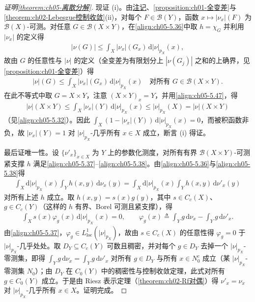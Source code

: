 \documentclass[../../main.tex]{subfiles}%
\begin{document}
\begin{proof}[证明\cref{theorem:ch05-离散分解}]
现证 (i)。由\hyperref[remark:ch05-变差可测]{注记}、\cref{proposition:ch01-全变差}与\cref{theorem:ch02-Lebesgue控制收敛}(ii)，对每个 $F\in\mathscr{B}(Y)$，函数 $x\mapsto|\nu_x|(F)$ 为 $\mathscr{B}(X)$-可测。对任意 $G\in\mathscr{B}(X\times Y)$，在\eqref{align:ch05-5.36}中取 $h=\chi_G$ 并利用 $|\nu_x|$ 的定义得
\begin{align*}
|\nu(G)|\leqslant\int_X|\nu_x|(G_x)\,\mathrm{d}|\nu|_{p_X}(x),
\end{align*}
故由 $G$ 的任意性与 $|\nu|$ 的定义（全变差为有限划分上 $|\nu(G_j)|$ 之和的上确界，见\cref{proposition:ch01-全变差}）得
\begin{align*}
|\nu|(G)\leqslant\int_X|\nu_x|(G_x)\,\mathrm{d}|\nu|_{p_X}(x)
\quad\text{对所有 }G\in\mathscr{B}(X\times Y).
\end{align*}
在此不等式中取 $G=X\times Y$，注意 $(X\times Y)_x=Y$，并用\eqref{align:ch05-5.47}，得
\begin{align*}
|\nu|(X\times Y)\leqslant\int_X|\nu_x|(Y)\,\mathrm{d}|\nu|_{p_X}(x)
\leqslant|\nu|_{p_X}(X)=|\nu|(X\times Y)
\end{align*}
（见\eqref{align:ch05-5.32}）。因此 $\int_X(1-|\nu_x|(Y))\,\mathrm{d}|\nu|_{p_X}(x)=0$，而被积函数非负，故 $|\nu_x|(Y)=1$ 对 $|\nu|_{p_X}$-几乎所有 $x\in X$ 成立，断言 (i) 得证。

最后证唯一性。设 $\{\nu'_x\}_{x\in X}$ 为 $Y$ 上的参数化测度，对所有有界 $\mathscr{B}(X\times Y)$-可测紧支撑 $h$ 满足\eqref{align:ch05-5.37}--\eqref{align:ch05-5.38}。由\eqref{align:ch05-5.36}与\eqref{align:ch05-5.38}得
\begin{align*}
\int_X\mathrm{d}|\nu|_{p_X}(x)\int_Y h(x,y)\,\mathrm{d}\nu_x(y)
=\int_X\mathrm{d}|\nu|_{p_X}(x)\int_Y h(x,y)\,\mathrm{d}\nu'_x(y)
\end{align*}
对所有上述 $h$ 成立。取 $h(x,y)=s(x)g(y)$，其中 $s\in C_c(X)$、$g\in C_c(Y)$（这样的 $h$ 有界、Borel 可测且紧支撑），得
\begin{align*}
\int_Xs(x)\varphi_g(x)\,\mathrm{d}|\nu|_{p_X}(x)=0,
\qquad
\varphi_g(x)\triangleq\int_Yg\,\mathrm{d}\nu_x-\int_Yg\,\mathrm{d}\nu'_x.
\end{align*}
由\eqref{align:ch05-5.37}，$\varphi_g\in L^1_{\mathrm{loc}}(|\nu|_{p_X})$，故由 $s\in C_c(X)$ 的任意性得 $\varphi_g=0$ 于 $|\nu|_{p_X}$-几乎处处。取 $D_Y\subseteq C_c(Y)$ 可数且稠密，并对每个 $g\in D_Y$ 去掉一个 $|\nu|_{p_X}$-零测集，即得 $\int_Yg\,\mathrm{d}\nu_x=\int_Yg\,\mathrm{d}\nu'_x$ 对所有 $g\in D_Y$ 与所有 $x\in N_0^c$ 成立（某 $|\nu|_{p_X}$-零测集 $N_0$）；由 $D_Y$ 在 $C_0(Y)$ 中的稠密性与控制收敛定理，此式对所有 $g\in C_0(Y)$ 成立。于是由 Riesz 表示定理（\cref{theorem:ch02-Rf对偶}）得 $\nu'_x=\nu_x$ 对 $|\nu|_{p_X}$-几乎所有 $x\in X$。证明完成。
\end{proof}
\end{document}

